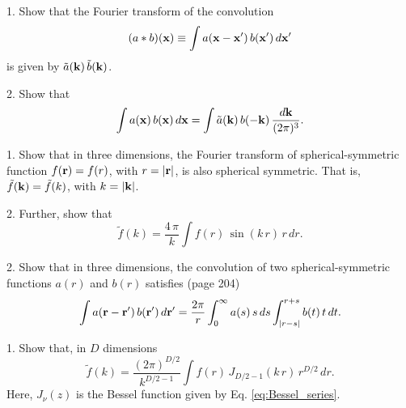 \documentclass{book}
\begin{document}

1. Show that the Fourier transform of the convolution
\begin{equation}
  (a*b)(\boldsymbol{\mathbf{x}})
\equiv
  \int a(\boldsymbol{\mathbf{x}} - \boldsymbol{\mathbf{x}}') \, b(\boldsymbol{\mathbf{x}}') \, d\boldsymbol{\mathbf{x}}'
  \label{eq:convolution}
\end{equation}
is given by $\tilde{a}(\boldsymbol{\mathbf{k}}) \, \tilde{b}(\boldsymbol{\mathbf{k}})$.

2. Show that
\begin{equation}
  \int a(\boldsymbol{\mathbf{x}}) \, b(\boldsymbol{\mathbf{x}}) \, d\boldsymbol{\mathbf{x}}
=
  \int \tilde{a}(\boldsymbol{\mathbf{k}}) \, b(-\boldsymbol{\mathbf{k}}) \, \frac{ d \boldsymbol{\mathbf{k}} }{(2\pi)^3}.
\end{equation}







1. Show that in three dimensions,
the Fourier transform of spherical-symmetric function
$f(\boldsymbol{\mathbf{r}}) = f(r)$, with $r = |\boldsymbol{\mathbf{r}}|$,
is also spherical symmetric.
%
That is, $\tilde f(\boldsymbol{\mathbf{k}}) = \tilde f(k)$, with $k = |\boldsymbol{\mathbf{k}}|$.

2. Further, show that
\begin{equation}
  \tilde f(k)
=
\frac{ 4 \, \pi } {k}
  \int
  f(r) \,
  \sin(k\,r) \,
  r \,
  dr.
  \label{eq:FourierTransformSpherical3D}
\end{equation}

2. Show that in three dimensions,
the convolution of
two spherical-symmetric functions $a(r)$ and $b(r)$
satisfies\cite{hill} (page 204)
\[
  \int a(\boldsymbol{\mathbf{r}} - \boldsymbol{\mathbf{r}}') \, b(\boldsymbol{\mathbf{r}}') \, d\boldsymbol{\mathbf{r}}'
=
  \frac{2\pi}{r}
  \int_0^\infty a(s) \, s \, ds
  \int_{|r-s|}^{r+s} b(t) \, t \, dt.
\]






1. Show that, in $D$ dimensions
\begin{equation}
  \tilde f(k)
=
  \frac{(2 \pi)^{D/2}} {k^{D/2 - 1}}
  \int
  f(r) \,
  J_{D/2-1}(k\,r) \,
  r^{D/2} \,
  dr.
  \label{eq:FourierTransformSpherical}
\end{equation}
Here, $J_\nu(z)$ is the Bessel function
given by Eq. \eqref{eq:Bessel_series}.

\end{document}
